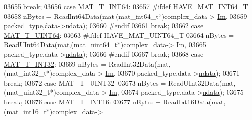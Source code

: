 \begin{DoxyCode}
{{{{{{{{{{{{{{{{{{03655                             \textcolor{keywordflow}{break};
03656                         \textcolor{keywordflow}{case} \hyperlink{group___m_a_t_ggacf7b3b879282b7ab3a51190e49bf3453a9e825b5d18b8f946eaf2b4b57e51c145}{MAT\_T\_INT64}:
03657 \textcolor{preprocessor}{#ifdef HAVE\_MAT\_INT64\_T}
03658                             nBytes = ReadInt64Data(mat,(mat\_int64\_t*)complex\_data->
      \hyperlink{group___m_a_t_a7182d10b0d3598415887376065440946}{Im},
03659                                 packed\_type,data->\hyperlink{group___m_a_t_a1beb8a8c58a808207cbea650563a9b63}{ndata});
03660 \textcolor{preprocessor}{#endif}
03661                             \textcolor{keywordflow}{break};
03662                         \textcolor{keywordflow}{case} \hyperlink{group___m_a_t_ggacf7b3b879282b7ab3a51190e49bf3453a45547932c46be27118abe08302d7e29f}{MAT\_T\_UINT64}:
03663 \textcolor{preprocessor}{#ifdef HAVE\_MAT\_UINT64\_T}
03664                             nBytes = ReadUInt64Data(mat,(mat\_uint64\_t*)complex\_data->
      \hyperlink{group___m_a_t_a7182d10b0d3598415887376065440946}{Im},
03665                                 packed\_type,data->\hyperlink{group___m_a_t_a1beb8a8c58a808207cbea650563a9b63}{ndata});
03666 \textcolor{preprocessor}{#endif}
03667                             \textcolor{keywordflow}{break};
03668                         \textcolor{keywordflow}{case} \hyperlink{group___m_a_t_ggacf7b3b879282b7ab3a51190e49bf3453a83e06a68320726c6572bfbb9f3addb1d}{MAT\_T\_INT32}:
03669                             nBytes = ReadInt32Data(mat,(mat\_int32\_t*)complex\_data->
      \hyperlink{group___m_a_t_a7182d10b0d3598415887376065440946}{Im},
03670                                 packed\_type,data->\hyperlink{group___m_a_t_a1beb8a8c58a808207cbea650563a9b63}{ndata});
03671                             \textcolor{keywordflow}{break};
03672                         \textcolor{keywordflow}{case} \hyperlink{group___m_a_t_ggacf7b3b879282b7ab3a51190e49bf3453aa397e285a23fe240368b752897652c6a}{MAT\_T\_UINT32}:
03673                             nBytes = ReadUInt32Data(mat,(mat\_uint32\_t*)complex\_data->
      \hyperlink{group___m_a_t_a7182d10b0d3598415887376065440946}{Im},
03674                                 packed\_type,data->\hyperlink{group___m_a_t_a1beb8a8c58a808207cbea650563a9b63}{ndata});
03675                             \textcolor{keywordflow}{break};
03676                         \textcolor{keywordflow}{case} \hyperlink{group___m_a_t_ggacf7b3b879282b7ab3a51190e49bf3453a8c5b2e381946e95ea8d81ac216743302}{MAT\_T\_INT16}:
03677                             nBytes = ReadInt16Data(mat,(mat\_int16\_t*)complex\_data->
}}}}}}}}}}}}}}}}}}
\end{DoxyCode}
